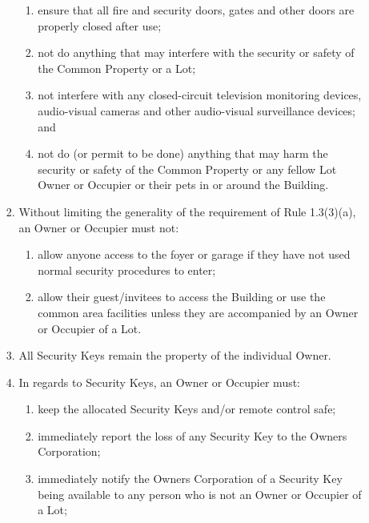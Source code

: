 \documentclass{article}
\begin{document}
\begin{enumerate}[label=\arabic*.]
\begin{enumerate}[label=\arabic{enumi}.\arabic*.]
\begin{enumerate}[label=(\arabic*)]
\begin{enumerate}[label=(\alph*)]
\item  ensure that all fire and security doors, gates and other doors are properly closed after use;

\item  not do anything that may interfere with the security or safety of the Common Property or a Lot;

\item  not interfere with any closed-circuit television monitoring devices, audio-visual cameras and other audio-visual surveillance devices; and

\item  not do (or permit to be done) anything that may harm the security or safety of the Common Property or any fellow Lot Owner or Occupier or their pets in or around the Building.

\end{enumerate}

\item  Without limiting the generality of the requirement of Rule 1.3(3)(a), an Owner or Occupier must not:

\begin{enumerate}[label=(\alph*)]

\item  allow anyone access to the foyer or garage if they have not used normal security procedures to enter;

\item  allow their guest/invitees to access the Building or use the common area facilities unless they are accompanied by an Owner or Occupier of a Lot.

\end{enumerate}

\item  All Security Keys remain the property of the individual Owner.

\item In regards to Security Keys, an Owner or Occupier must:

\begin{enumerate}[label=(\alph*)]

\item  keep the allocated Security Keys and/or remote control safe;

\item  immediately report the loss of any Security Key to the Owners Corporation;

\item  immediately notify the Owners Corporation of a Security Key being available to any person who is not an Owner or Occupier of a Lot;


\end{enumerate}
\end{enumerate}
\end{enumerate}
\end{enumerate}
\end{document}
